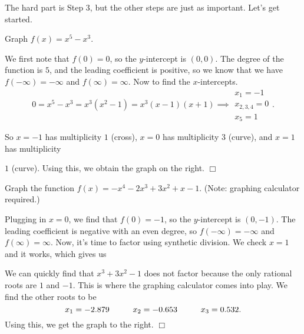 \documentclass[../book.tex]{subfiles}
\begin{document}
\begin{wrapfigure}{r}{5cm}
\end{wrapfigure}

The hard part is Step 3, but the other steps are just as important.  Let's get started.

\begin{example}
Graph $f(x)=x^5-x^3$.
\end{example}
\begin{solution}
We first note that $f(0)=0$, so the $y$-intercept is $(0,0)$. The degree of the function is $5$, and the leading coefficient is positive, so we know that we have $f(-\infty)=-\infty$ and $f(\infty)=\infty$.  Now to find the $x$-intercepts. $$0=x^5-x^3=x^3(x^2-1)=x^3(x-1)(x+1) \implies \begin{matrix} x_1=-1 \\ x_{2,3,4}=0 \\ x_5=1 \end{matrix}.$$ 
\end{solution}
\noindent So $x=-1$ has multiplicity $1$ (cross), $x=0$ has multiplicity $3$ (curve), and $x=1$ has multiplicity 

\begin{wrapfigure}{r}{5cm}
\end{wrapfigure}

\noindent $1$ (curve). Using this, we obtain the graph on the right. $\Box$
\begin{example}
Graph the function $f(x)=-x^4-2x^3+3x^2+x-1.$ (Note: graphing calculator required.)
\end{example}
\begin{solution}
Plugging in $x=0$, we find that $f(0)=-1$, so the $y$-intercept is $(0,-1)$. The leading coefficient is negative with an even degree, so $f(-\infty)=-\infty$ and $f(\infty)=\infty$.  Now, it's time to factor using synthetic division.  We check $x=1$ and it works, which gives us


We can quickly find that $x^3+3x^2-1$ does not factor because the only rational roots are $1$ and $-1$.  This is where the graphing calculator comes into play.  We find the other roots to be $$x_1=-2.879 \hspace{10mm} x_2=-0.653 \hspace{10mm} x_3=0.532.$$ Using this, we get the graph to the right. $\Box$
\end{solution}
\end{document}
